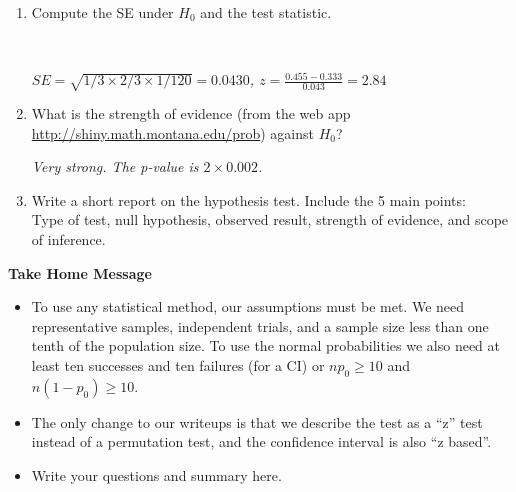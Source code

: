 \begin{enumerate}
\begin{key} 
{\it $H_0: p = 1/3$, versus $H_a:  p \neq 1/3$}
\end{key}
 
\item Compute the SE under $H_0$ and the test statistic.
\begin{students}
    \vspace{1cm}    \\
\end{students}

\begin{key} 
{\it $SE = \sqrt{1/3 \times 2/3 \times 1/120} =0.0430$, $z = \frac{0.455 - 0.333}{0.043} = 2.84$}
\end{key}


\item What is the strength of evidence (from the web app
  \url{http://shiny.math.montana.edu/prob}) against   $H_0$?  
\begin{students}
        \newpage
\end{students}

\begin{key} 
{\it Very strong.  The p-value is $2 \times 0.002$. }
\end{key}

\item Write a short report on the hypothesis test. Include the 5 main
  points:\\
  Type of test, null hypothesis, observed result, strength of
  evidence, and scope of inference. \vfill

\end{enumerate}



\begin{center}
  {\large\bf Take Home Message}
\end{center}
 
\begin{itemize}
\item To use any statistical method, our assumptions must be met. We
  need representative samples, independent trials, and a sample size
  less than one tenth of the population size.  To use the normal
  probabilities we also need at least ten successes and ten failures
  (for a CI) or $np_0 \geq 10$ and $n(1-p_0) \geq 10$.  
\item The only change to our writeups is that we describe the test as
  a ``z'' test instead of a permutation test, and the confidence
  interval is also ``z based''.
\item Write your questions and summary here.

\end{itemize}\vspace*{1in}



